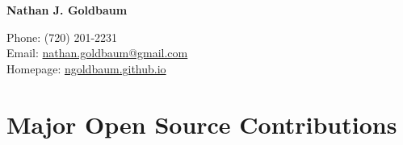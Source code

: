 \documentclass[10pt,letterpaper]{article}
\def\name{Nathan J. Goldbaum}
\begin{document}
{\huge \bf \name}


\bigskip

\begin{minipage}[t]{0.4\textwidth}
  Phone: (720) 201-2231 \\  %
  Email: \href{mailto:nathan.goldbaum@gmail.com}{nathan.goldbaum@gmail.com} \\
  Homepage: \href{ngoldbaum.github.io}{ngoldbaum.github.io}
\end{minipage}

\section*{Major Open Source Contributions}
\end{document}
